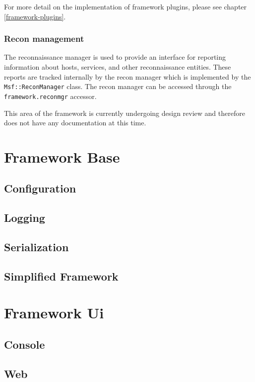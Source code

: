 \documentclass{report}
\begin{document}
\par
For more detail on the implementation of framework plugins, please
see chapter \ref{framework-plugins}.

            \subsubsection{Recon management}

\par
The reconnaissance manager is used to provide an interface for
reporting information about hosts, services, and other
reconnaissance entities.  These reports are tracked internally by
the recon manager which is implemented by the
\texttt{Msf::ReconManager} class.  The recon manager can be accessed
through the \texttt{framework.reconmgr} accessor.

\par
This area of the framework is currently undergoing design review and
therefore does not have any documentation at this time.

    \section{Framework Base}
        \subsection{Configuration}
        \subsection{Logging}
        \subsection{Serialization}
        \subsection{Simplified Framework}
    \section{Framework Ui}
        \subsection{Console}
        \subsection{Web}
\end{document}
